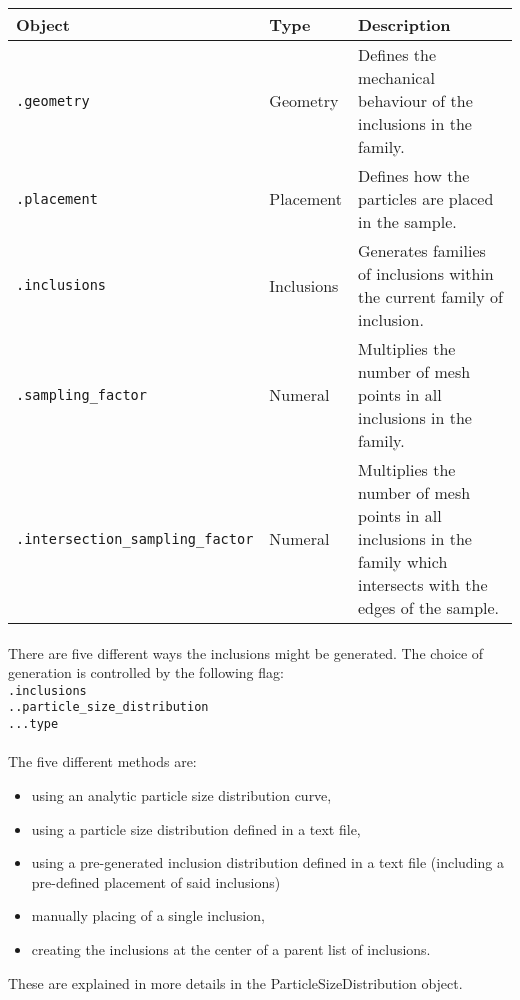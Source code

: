 \documentclass[10pt]{article}
\begin{document}
\begin{tabularx}{\textwidth}{llX}
\hline 
Object & Type & Description \\ 
\hline 
\verb+.geometry+ & Geometry & Defines the mechanical behaviour of the inclusions in the family. \\ 
\verb+.placement+ & Placement & Defines how the particles are placed in the sample.\\ 
\verb+.inclusions+ & Inclusions & Generates families of inclusions within the current family of inclusion.\\
\verb+.sampling_factor+ & Numeral & Multiplies the number of mesh points in all inclusions in the family.\\
\verb+.intersection_sampling_factor+ & Numeral & Multiplies the number of mesh points in all inclusions in the family which intersects with the edges of the sample.\\
\hline 
\end{tabularx}


\paragraph{} There are five different ways the inclusions might be generated. The choice of generation is controlled by the following flag:\\
\verb+.inclusions+\\
\verb+..particle_size_distribution+\\
\verb+...type+

\paragraph{} The five different methods are:
\begin{itemize}
	\item using an analytic particle size distribution curve,
	\item using a particle size distribution defined in a text file,
	\item using a pre-generated inclusion distribution defined in a text file (including a pre-defined placement of said inclusions)
	\item manually placing of a single inclusion,
	\item creating the inclusions at the center of a parent list of inclusions.
\end{itemize}

These are explained in more details in the ParticleSizeDistribution object.
\end{document}
